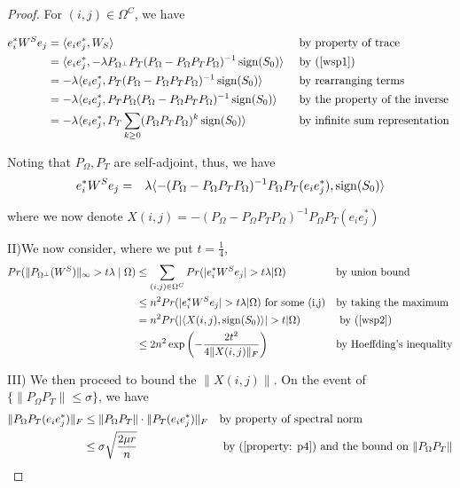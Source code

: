 \begin{proof}
For $(i,j)\in\Omega^{C}$, we have

\[
\begin{aligned}
e_{i}^{*}W^{S}e_{j} 
& = \langle e_{i}e_{j}^{*},W_{S} \rangle
&&\text{ by property of trace}\\
& = \langle e_{i}e_{j}^{*},-\lambda P_{\Omega^{\bot}}P_{T}(P_{\Omega}-P_{\Omega}P_{T}P_{\Omega})^{-1} \operatorname{sign}(S_{0}) \rangle
&&\text{ by (\ref{wsp1})}\\
& = -\lambda \langle e_{i}e_{j}^{*},P_{T}(P_{\Omega}-P_{\Omega}P_{T}P_{\Omega})^{-1} \operatorname{sign}(S_{0}) \rangle
&&\text{ by rearranging terms}\\
& = -\lambda \langle e_{i}e_{j}^{*},P_{T}P_{\Omega}(P_{\Omega}-P_{\Omega}P_{T}P_{\Omega})^{-1} \operatorname{sign}(S_{0}) \rangle
&&\text{ by the property of the inverse }\\
& = -\lambda \langle e_{i}e_{j}^{*},P_{T}\sum_{k\ge0}(P_{\Omega}P_{T}P_{\Omega})^{k} \operatorname{sign}(S_{0}) \rangle 
&&\text{ by infinite sum representation}
\end{aligned}
\]

Noting that $P_{\Omega},P_{T}$ are self-adjoint, thus, we have
\begin{eqnarray}
e_{i}^{*}W^{S}e_{j} & = & \lambda \langle-(P_{\Omega}-P_{\Omega}P_{T}P_{\Omega})^{-1}P_{\Omega}P_{T}(e_{i}e_{j}^{*}), \operatorname{sign}(S_{0}) \rangle
\label{wsp2}
\end{eqnarray}


where we now denote $X(i,j)=-(P_{\Omega}-P_{\Omega}P_{T}P_{\Omega})^{-1}P_{\Omega}P_{T}(e_{i}e_{j}^{*})$

II)We now consider, where we put $t=\frac{1}{4}$,
\[
\begin{aligned}
Pr(\|P_{\Omega^{\bot}}(W^{S})\|_{\infty}>t\lambda\mid\Omega) 
& \le \sum_{(i,j)\in\Omega^{C}}Pr(|e_{i}^{*}W^{S}e_{j}|>t\lambda|\Omega) 
&&\text{by union bound}\\
& \le n^{2}Pr(|e_{i}^{*}W^{S}e_{j}|>t\lambda|\Omega)\text{ for some (i,j)} 
&&\text{by taking the maximum}\\
& = n^{2}Pr(| \langle X(i,j), \sign(S_{0}) \rangle|>t|\Omega) 
&&\text{ by (\ref{wsp2})}\\
& \le 2n^{2}\exp \left( -\frac{2t^{2}}{4\|X(i,j)\|_{F}} \right)
&&\text{by Hoeffding's inequality}
\end{aligned}
\]

III) We then proceed to bound the $\|X(i,j)\|$. On the event of $\{\|P_{\Omega}P_{T}\|\le\sigma\}$,
we have
\[
\begin{aligned}
\|P_{\Omega}P_{T}(e_{i}e_{j}^{*})\|_{F} 
& \le \|P_{\Omega}P_{T}\|\cdot\|P_{T}(e_{i}e_{j}^{*})\|_{F} 
&&\text{by property of spectral norm}\\
& \le \sigma\sqrt{\frac{2\mu r}{n}} 
&&\text{ by (\ref{property: p4}) and the bound on } \|P_{\Omega}P_{T}\|
\end{aligned}
\]



\end{proof}
